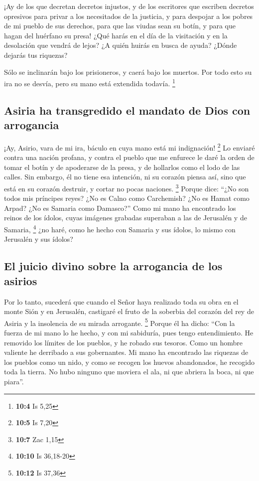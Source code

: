  ¡Ay de los que decretan decretos injustos, y de los
escritores que escriben decretos opresivos  para privar a
los necesitados de la justicia, y para despojar a los pobres de mi
pueblo de sus derechos, para que las viudas sean su botín, y para que
hagan del huérfano su presa!  ¿Qué harás en el día de la
visitación y en la desolación que vendrá de lejos? ¿A quién huirás en
busca de ayuda? ¿Dónde dejarás tus riquezas?

 Sólo se inclinarán bajo los prisioneros, y caerá bajo los
muertos. Por todo esto su ira no se desvía, pero su mano está extendida
todavía. \footnote{\textbf{10:4} Is 5,25}

\hypertarget{asiria-ha-transgredido-el-mandato-de-dios-con-arrogancia}{%
\subsection{Asiria ha transgredido el mandato de Dios con
arrogancia}\label{asiria-ha-transgredido-el-mandato-de-dios-con-arrogancia}}

 ¡Ay, Asirio, vara de mi ira, báculo en cuya mano está mi
indignación! \footnote{\textbf{10:5} Is 7,20}  Lo enviaré
contra una nación profana, y contra el pueblo que me enfurece le daré la
orden de tomar el botín y de apoderarse de la presa, y de hollarlos como
el lodo de las calles.  Sin embargo, él no tiene esa
intención, ni su corazón piensa así, sino que está en su corazón
destruir, y cortar no pocas naciones. \footnote{\textbf{10:7} Zac 1,15}
 Porque dice: ``¿No son todos mis príncipes reyes?
 ¿No es Calno como Carchemish? ¿No es Hamat como Arpad?
¿No es Samaria como Damasco?''  Como mi mano ha
encontrado los reinos de los ídolos, cuyas imágenes grabadas superaban a
las de Jerusalén y de Samaria, \footnote{\textbf{10:10} Is 36,18-20}
 ¿no haré, como he hecho con Samaria y sus ídolos, lo
mismo con Jerusalén y sus ídolos?

\hypertarget{el-juicio-divino-sobre-la-arrogancia-de-los-asirios}{%
\subsection{El juicio divino sobre la arrogancia de los
asirios}\label{el-juicio-divino-sobre-la-arrogancia-de-los-asirios}}

 Por lo tanto, sucederá que cuando el Señor haya
realizado toda su obra en el monte Sión y en Jerusalén, castigaré el
fruto de la soberbia del corazón del rey de Asiria y la insolencia de su
mirada arrogante. \footnote{\textbf{10:12} Is 37,36} 
Porque él ha dicho: ``Con la fuerza de mi mano lo he hecho, y con mi
sabiduría, pues tengo entendimiento. He removido los límites de los
pueblos, y he robado sus tesoros. Como un hombre valiente he derribado a
sus gobernantes.  Mi mano ha encontrado las riquezas de
los pueblos como un nido, y como se recogen los huevos abandonados, he
recogido toda la tierra. No hubo ninguno que moviera el ala, ni que
abriera la boca, ni que piara''.

